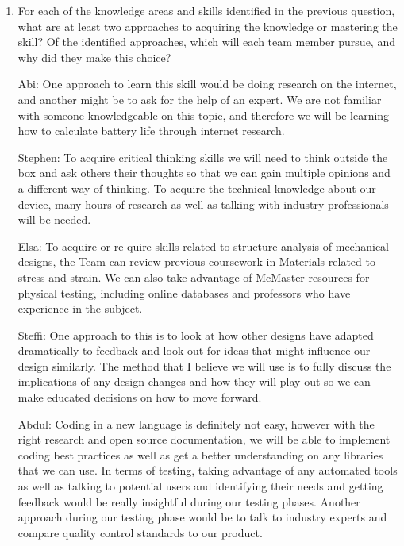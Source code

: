\documentclass[12pt, titlepage]{article}
\begin{document}
\begin{enumerate}
  \item For each of the knowledge areas and skills identified in the previous
  question, what are at least two approaches to acquiring the knowledge or
  mastering the skill?  Of the identified approaches, which will each team
  member pursue, and why did they make this choice?

Abi: One approach to learn this skill would be doing research on the internet, and another might be to ask for the help of an expert. We are not familiar with someone knowledgeable on this topic, and therefore we will be learning how to calculate battery life through internet research. 

Stephen: To acquire critical thinking skills we will need to think outside the box and ask others their thoughts so that we can gain multiple opinions and a different way of thinking. To acquire the technical knowledge about our device, many hours of research as well as talking with industry professionals will be needed.

Elsa: To acquire or re-quire skills related to structure analysis of mechanical designs, the Team can review previous coursework in Materials related to stress and strain. We can also take advantage of McMaster resources for physical testing, including online databases and professors who have experience in the subject. 

Steffi: One approach to this is to look at how other designs have adapted dramatically to feedback and look out for ideas that might influence our design similarly.  The method that I believe we will use is to fully discuss the implications of any design changes and how they will play out so we can make educated decisions on how to move forward.

Abdul: Coding in a new language is definitely not easy, however with the right research and open source documentation, we will be able to implement coding best practices as well as get a better understanding on any libraries that we can use. In terms of testing, taking advantage of any automated tools as well as talking to potential users and identifying their needs and getting feedback would be really insightful during our testing phases. Another approach during our testing phase would be to talk to industry experts and compare quality control standards to our product. 

\end{enumerate}
\end{document}
